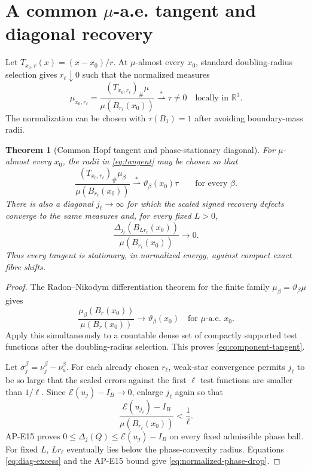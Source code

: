 \documentclass[10pt]{article}
\newtheorem{theorem}{Theorem}[section]
\newcommand{\RR}{\mathbb R}
\newcommand{\cE}{\mathcal E}
\begin{document}
\section[A common tangent and diagonal recovery]
{A common \(\mu\)-a.e. tangent and diagonal recovery}

Let $T_{x_0,r}(x)=(x-x_0)/r$.  At $\mu$-almost every $x_0$, standard
doubling-radius selection gives $r_\ell\downarrow0$ such that the normalized
measures
\begin{equation}
 \mu_{x_0,r_\ell}
 =\frac{(T_{x_0,r_\ell})_\#\mu}{\mu(B_{r_\ell}(x_0))}
 \stackrel{*}{\rightharpoonup}\tau\neq0
 \quad\text{locally in }\RR^3.
 \label{eq:tangent}
\end{equation}
The normalization can be chosen with
$\tau(B_1)=1$ after avoiding boundary-mass radii.

\begin{theorem}[Common Hopf tangent and phase-stationary diagonal]
For $\mu$-almost every $x_0$, the radii in \eqref{eq:tangent} may be chosen so
that
\begin{equation}
 \frac{(T_{x_0,r_\ell})_\#\mu_\beta}
      {\mu(B_{r_\ell}(x_0))}
 \stackrel{*}{\rightharpoonup}
 \vartheta_\beta(x_0)\tau
 \qquad\text{for every }\beta.
 \label{eq:component-tangent}
\end{equation}
There is also a diagonal $j_\ell\to\infty$ for which the scaled signed
recovery defects converge to the same measures and, for every fixed $L>0$,
\begin{equation}
 \frac{\Delta_{j_\ell}(B_{Lr_\ell}(x_0))}
      {\mu(B_{r_\ell}(x_0))}\longrightarrow0.
 \label{eq:normalized-phase-drop}
\end{equation}
Thus every tangent is stationary, in normalized energy, against compact
exact fibre shifts.
\end{theorem}

\begin{proof}
The Radon--Nikodym differentiation theorem for the finite family
$\mu_\beta=\vartheta_\beta\mu$ gives
\[
 \frac{\mu_\beta(B_r(x_0))}{\mu(B_r(x_0))}
 \longrightarrow\vartheta_\beta(x_0)
 \quad\text{for $\mu$-a.e. }x_0.
\]
Apply this simultaneously to a countable dense set of compactly supported
test functions after the doubling-radius selection.  This proves
\eqref{eq:component-tangent}.

Let $\sigma_j^\beta=\nu_j^\beta-\nu_u^\beta$.  For each already chosen
$r_\ell$, weak-star convergence permits $j_\ell$ to be so large that the
scaled errors against the first $\ell$ test functions are smaller than
$1/\ell$.  Since $\cE(u_j)-I_B\to0$, enlarge $j_\ell$ again so that
\begin{equation}
 \frac{\cE(u_{j_\ell})-I_B}{\mu(B_{r_\ell}(x_0))}
 <\frac1\ell.                                        \label{eq:diag-excess}
\end{equation}
AP-E15 proves
$0\leq\Delta_j(Q)\leq\cE(u_j)-I_B$ on every fixed admissible phase ball.
For fixed $L$, $Lr_\ell$ eventually lies below the phase-convexity radius.
Equations \eqref{eq:diag-excess} and the AP-E15 bound give
\eqref{eq:normalized-phase-drop}.
\end{proof}
\end{document}
